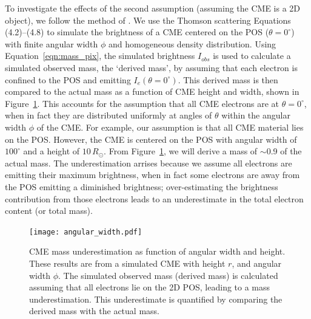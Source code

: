 To investigate the effects of the second assumption (assuming the CME is a 2D object), we follow the method of \citet{vou00}. We use the Thomson scattering Equations (4.2)--(4.8) to simulate the brightness of a CME centered on the POS ($\theta=0^{\circ}$) with finite angular width $\phi$ and homogeneous density distribution. Using Equation~\ref{eqn:mass_pix}, the simulated brightness $I_{obs}$ is used to calculate a simulated observed mass, the `derived mass', by assuming that each electron is confined to the POS and emitting $I_e(\theta=0^{\circ})$. This derived mass is then compared to the actual mass as a function of CME height and width, shown in Figure~\ref{fig:ang_width_error}. This accounts for the assumption that all CME electrons are at $\theta=0^{\circ}$, when in fact they are distributed uniformly at angles of $\theta$ within the angular width $\phi$ of the CME.
For example, our assumption is that all CME material lies on the POS. However, the CME is centered on the POS with angular width of $100^{\circ}$ and a height of $10\,R_{\odot}$. From Figure~\ref{fig:ang_width_error}, we will derive a mass of $\sim$0.9 of the actual mass. 
The underestimation arrises because we assume all electrons are emitting their maximum brightness, when in fact some electrons are away from the POS emitting a diminished brightness; over-estimating the brightness contribution from those electrons leads to an underestimate in the total electron content (or total mass). 
\begin{figure}[!t]
\begin{center}
\texttt{[image: angular\_width.pdf]}
\caption[Uncertainty due to CME angular width]{CME mass underestimation as function of angular width and height. These results are from a simulated CME with height $r$, and angular width $\phi$. The simulated observed mass (derived mass) is calculated assuming that all electrons lie on the 2D POS, leading to a mass underestimation. This underestimate is quantified by comparing the derived mass with the actual mass.}
\label{fig:ang_width_error}
\end{center}
\end{figure}



